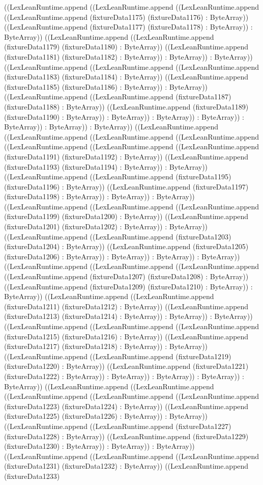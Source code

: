 \documentclass[11pt]{article}
\begin{document}
((LexLeanRuntime.append ((LexLeanRuntime.append ((LexLeanRuntime.append ((LexLeanRuntime.append (fixtureData1175) (fixtureData1176) : ByteArray)) ((LexLeanRuntime.append (fixtureData1177) (fixtureData1178) : ByteArray)) : ByteArray)) ((LexLeanRuntime.append ((LexLeanRuntime.append (fixtureData1179) (fixtureData1180) : ByteArray)) ((LexLeanRuntime.append (fixtureData1181) (fixtureData1182) : ByteArray)) : ByteArray)) : ByteArray)) ((LexLeanRuntime.append ((LexLeanRuntime.append ((LexLeanRuntime.append (fixtureData1183) (fixtureData1184) : ByteArray)) ((LexLeanRuntime.append (fixtureData1185) (fixtureData1186) : ByteArray)) : ByteArray)) ((LexLeanRuntime.append ((LexLeanRuntime.append (fixtureData1187) (fixtureData1188) : ByteArray)) ((LexLeanRuntime.append (fixtureData1189) (fixtureData1190) : ByteArray)) : ByteArray)) : ByteArray)) : ByteArray)) : ByteArray)) : ByteArray)) : ByteArray)) ((LexLeanRuntime.append ((LexLeanRuntime.append ((LexLeanRuntime.append ((LexLeanRuntime.append ((LexLeanRuntime.append ((LexLeanRuntime.append ((LexLeanRuntime.append (fixtureData1191) (fixtureData1192) : ByteArray)) ((LexLeanRuntime.append (fixtureData1193) (fixtureData1194) : ByteArray)) : ByteArray)) ((LexLeanRuntime.append ((LexLeanRuntime.append (fixtureData1195) (fixtureData1196) : ByteArray)) ((LexLeanRuntime.append (fixtureData1197) (fixtureData1198) : ByteArray)) : ByteArray)) : ByteArray)) ((LexLeanRuntime.append ((LexLeanRuntime.append ((LexLeanRuntime.append (fixtureData1199) (fixtureData1200) : ByteArray)) ((LexLeanRuntime.append (fixtureData1201) (fixtureData1202) : ByteArray)) : ByteArray)) ((LexLeanRuntime.append ((LexLeanRuntime.append (fixtureData1203) (fixtureData1204) : ByteArray)) ((LexLeanRuntime.append (fixtureData1205) (fixtureData1206) : ByteArray)) : ByteArray)) : ByteArray)) : ByteArray)) ((LexLeanRuntime.append ((LexLeanRuntime.append ((LexLeanRuntime.append ((LexLeanRuntime.append (fixtureData1207) (fixtureData1208) : ByteArray)) ((LexLeanRuntime.append (fixtureData1209) (fixtureData1210) : ByteArray)) : ByteArray)) ((LexLeanRuntime.append ((LexLeanRuntime.append (fixtureData1211) (fixtureData1212) : ByteArray)) ((LexLeanRuntime.append (fixtureData1213) (fixtureData1214) : ByteArray)) : ByteArray)) : ByteArray)) ((LexLeanRuntime.append ((LexLeanRuntime.append ((LexLeanRuntime.append (fixtureData1215) (fixtureData1216) : ByteArray)) ((LexLeanRuntime.append (fixtureData1217) (fixtureData1218) : ByteArray)) : ByteArray)) ((LexLeanRuntime.append ((LexLeanRuntime.append (fixtureData1219) (fixtureData1220) : ByteArray)) ((LexLeanRuntime.append (fixtureData1221) (fixtureData1222) : ByteArray)) : ByteArray)) : ByteArray)) : ByteArray)) : ByteArray)) ((LexLeanRuntime.append ((LexLeanRuntime.append ((LexLeanRuntime.append ((LexLeanRuntime.append ((LexLeanRuntime.append (fixtureData1223) (fixtureData1224) : ByteArray)) ((LexLeanRuntime.append (fixtureData1225) (fixtureData1226) : ByteArray)) : ByteArray)) ((LexLeanRuntime.append ((LexLeanRuntime.append (fixtureData1227) (fixtureData1228) : ByteArray)) ((LexLeanRuntime.append (fixtureData1229) (fixtureData1230) : ByteArray)) : ByteArray)) : ByteArray)) ((LexLeanRuntime.append ((LexLeanRuntime.append ((LexLeanRuntime.append (fixtureData1231) (fixtureData1232) : ByteArray)) ((LexLeanRuntime.append (fixtureData1233) 
\end{document}
